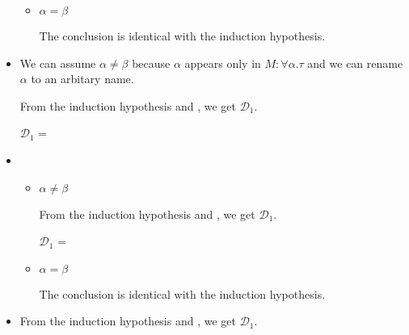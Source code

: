 \begin{itemize}
\begin{itemize}
	      	\item $\alpha = \beta$
	      	      	      	      	      	      
	      	      The conclusion is identical with the induction hypothesis.
	      	      	      	      	      	      
	      \end{itemize}
	      	      	      
	\item \QIns
	      	      	      
	      We can assume $\alpha \neq \beta$ because $\alpha$ appears only in $M:\forall\alpha.\tau$ and we can rename $\alpha$ to an arbitary name.
	      	      	      
	      From the induction hypothesis and \QIns, we get $\mathcal{D}_1$.
	      	      	      
	      $\mathcal{D}_1$ = 
	      {}
	      	      	      
	\item \QCsp
	      	      	      
	      \begin{itemize}
	      		      		      	
	      	\item $\alpha \neq \beta$
	      	      	      	      	      	      
	      	      From the induction hypothesis and \QCsp, we get $\mathcal{D}_1$.
	      	      	      	      	      	      
	      	      $\mathcal{D}_1$ = 
	      	      {}
	      	      	      	      	      	      
	      	\item $\alpha = \beta$
	      	      	      	      	      	      
	      	      The conclusion is identical with the induction hypothesis.
	      	      	      	      	      	      
	      \end{itemize}
	      	      	      
	\item \QRefl
	      	      	      
	      From the induction hypothesis and \QRefl, we get $\mathcal{D}_1$.
	      	      	      

\end{itemize}
